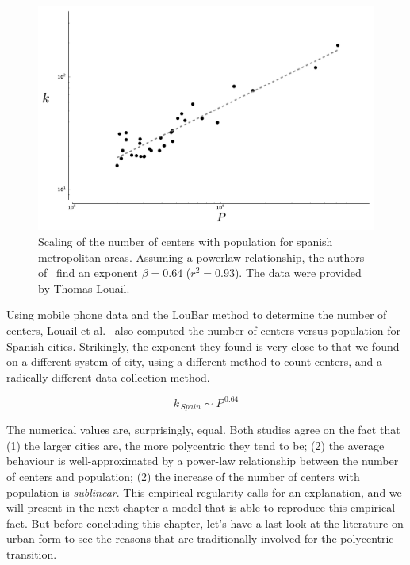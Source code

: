 \begin{figure}
    \centering
    \includegraphics[width=\textwidth]{gfx/chapter-monocentric/spain_num-centers.pdf}
    \caption{Scaling of the number of centers with population for spanish
        metropolitan areas. Assuming a powerlaw relationship, the authors
    of~\cite{Louail:2014} find an exponent $\beta = 0.64$ ($r^2=0.93$). The data
were provided by Thomas Louail.\label{fig:centers_spain}}
\end{figure}

Using mobile phone data and the LouBar method to determine the number of
centers, Louail et al.~\cite{Louail:2014} also computed the number of centers
versus population for Spanish cities. Strikingly, the exponent they found is
very close to that we found on a different system of city, using a different
method to count centers, and a radically different data collection method.

\begin{equation}
    k_{\,Spain} \sim P^{\,0.64}
\end{equation}

The numerical values are, surprisingly, equal. Both studies agree on the fact that (1)
the larger cities are, the more polycentric they tend to be; (2) the average
behaviour is well-approximated by a power-law relationship between the number of
centers and population; (2) the increase of the number of centers with
population is \emph{sublinear}. This empirical regularity calls for an
explanation, and we will present in the next chapter a model that is able to
reproduce this empirical fact. But before concluding this chapter, let's have a
last look at the literature on urban form to see the reasons that are
traditionally involved for the polycentric transition.

